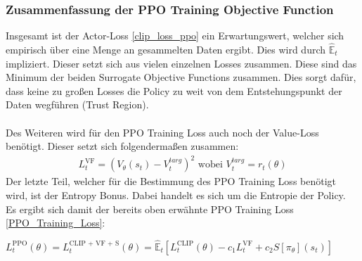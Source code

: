 \subsubsection{Zusammenfassung der PPO Training Objective Function} \label{sec:PPO_Training_Objective_Function}
Insgesamt ist der Actor-Loss \ref{clip_loss_ppo} ein Erwartungswert, welcher sich empirisch über eine Menge an gesammelten Daten ergibt. Dies wird durch $\mathbb{\hat{E}}_{t}$ impliziert. Dieser setzt sich aus vielen einzelnen Losses zusammen. Diese sind das Minimum der beiden Surrogate Objective Functions zusammen. Dies sorgt dafür, dass keine zu großen Losses die Policy zu weit von dem Entstehungspunkt der Daten wegführen (Trust Region). \cite[S. 3f.]{PPO}\\
\\Des Weiteren wird für den PPO Training Loss auch noch der Value-Loss benötigt. Dieser setzt sich folgendermaßen zusammen:
\begin{align}
	\label{eq:Value_Loss}
	L^{\text{VF}}_{t} = (V_{\theta}(s_{t})-V_{t}^{targ})^2 \text{ wobei } V_{t}^{targ} = r_{t}(\theta)
\end{align} 
Der letzte Teil, welcher für die Bestimmung des PPO Training Loss benötigt wird, ist der Entropy Bonus. Dabei handelt es sich um die Entropie der Policy.\\
Es ergibt sich damit der bereits oben erwähnte PPO Training Loss \ref{PPO_Training_Loss}:
\begin{center}
	$L^\text{PPO}_{t} (\theta) = L^\text{CLIP + VF + S}_{t} (\theta) = \mathbb{\hat{E}}_{t} [L^{\text{CLIP}}_{t}(\theta) - c_{1}L^{\text{VF}}_{t} + c_{2}S[\pi_{\theta}](s_{t})]$
\end{center}

